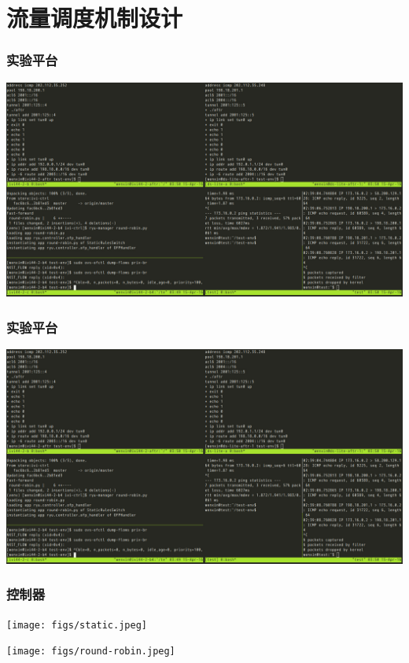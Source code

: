 \documentclass{beamer}
\begin{document}
\section{流量调度机制设计}

\begin{frame}
  \frametitle{实验平台}

  \begin{center}
    \includegraphics[width=\textwidth]{figs/test-env.jpeg}
  \end{center}
\end{frame}

\begin{frame}
  \frametitle{实验平台}

  \begin{center}
    \includegraphics[width=\textwidth]{figs/test-env.jpeg}
  \end{center}
\end{frame}

\begin{frame}
  \frametitle{控制器}

  \begin{center}
    \texttt{[image: figs/static.jpeg]}
  \end{center}

  \begin{center}
    \texttt{[image: figs/round-robin.jpeg]}  
  \end{center}
  
\end{frame}
\end{document}
